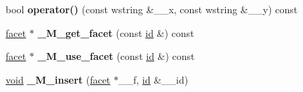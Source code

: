 \begin{DoxyCompactItemize}
\item 
\mbox{\label{classlocale_ac4fe5e154443486d5c6498b47d52d9c2}} 
bool {\bfseries operator()} (const wstring \&\+\_\+\+\_\+x, const wstring \&\+\_\+\+\_\+y) const
\item 
\mbox{\label{classlocale_a79b9a801d945797f030e17a1248740a0}} 
\hyperlink{classlocale_1_1facet}{facet} $\ast$ {\bfseries \+\_\+\+M\+\_\+get\+\_\+facet} (const \hyperlink{classlocale_1_1id}{id} \&) const
\item 
\mbox{\label{classlocale_a35e4f9f07bcaf8ea0bc78f1ebe3df9ca}} 
\hyperlink{classlocale_1_1facet}{facet} $\ast$ {\bfseries \+\_\+\+M\+\_\+use\+\_\+facet} (const \hyperlink{classlocale_1_1id}{id} \&) const
\item 
\mbox{\label{classlocale_a5360e2ba7d065f1deaa474cca8f279d0}} 
\hyperlink{interfacevoid}{void} {\bfseries \+\_\+\+M\+\_\+insert} (\hyperlink{classlocale_1_1facet}{facet} $\ast$\+\_\+\+\_\+f, \hyperlink{classlocale_1_1id}{id} \&\+\_\+\+\_\+id)
\end{DoxyCompactItemize}
